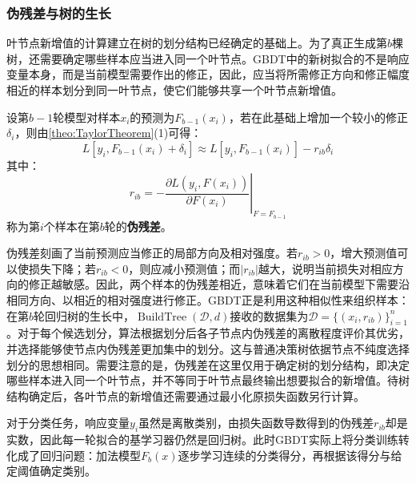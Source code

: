 \subsubsection{伪残差与树的生长}
叶节点新增值的计算建立在树的划分结构已经确定的基础上。为了真正生成第$b$棵树，还需要确定哪些样本应当进入同一个叶节点。GBDT中的新树拟合的不是响应变量本身，而是当前模型需要作出的修正，因此，应当将所需修正方向和修正幅度相近的样本划分到同一叶节点，使它们能够共享一个叶节点新增值。\par
设第$b-1$轮模型对样本$x_i$的预测为$F_{b-1}(x_i)$，若在此基础上增加一个较小的修正$\delta_i$，则由\cref{theo:TaylorTheorem}(1)可得：
\begin{equation*}
	L[y_i,F_{b-1}(x_i)+\delta_i]\approx L[y_i,F_{b-1}(x_i)]-r_{ib}\delta_i
\end{equation*}
其中：
\begin{equation*}
	r_{ib}=-\left.\frac{\partial L(y_i,F(x_i))}{\partial F(x_i)}\right|_{F=F_{b-1}}
\end{equation*}
称为第$i$个样本在第$b$轮的\textbf{伪残差}。\par
伪残差刻画了当前预测应当修正的局部方向及相对强度。若$r_{ib}>0$，增大预测值可以使损失下降；若$r_{ib}<0$，则应减小预测值；而$|r_{ib}|$越大，说明当前损失对相应方向的修正越敏感。因此，两个样本的伪残差相近，意味着它们在当前模型下需要沿相同方向、以相近的相对强度进行修正。GBDT正是利用这种相似性来组织样本：在第$b$轮回归树的生长中，$\operatorname{BuildTree}(\mathcal{D},d)$接收的数据集为$\mathcal{D}=\{(x_i,r_{ib})\}_{i=1}^n$。对于每个候选划分，算法根据划分后各子节点内伪残差的离散程度评价其优劣，并选择能够使节点内伪残差更加集中的划分。这与普通决策树依据节点不纯度选择划分的思想相同。需要注意的是，伪残差在这里仅用于确定树的划分结构，即决定哪些样本进入同一个叶节点，并不等同于叶节点最终输出想要拟合的新增值。待树结构确定后，各叶节点的新增值还需要通过最小化原损失函数另行计算。\par
对于分类任务，响应变量$y_i$虽然是离散类别，由损失函数导数得到的伪残差$r_{ib}$却是实数，因此每一轮拟合的基学习器仍然是回归树。此时GBDT实际上将分类训练转化成了回归问题：加法模型$F_b(x)$逐步学习连续的分类得分，再根据该得分与给定阈值确定类别。
